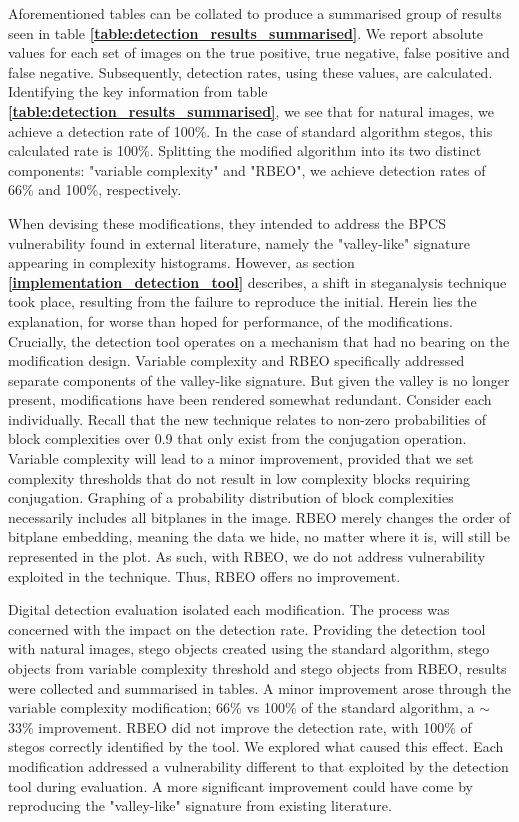 \documentclass{l4proj}
\begin{document}
Aforementioned tables can be collated to produce a summarised group of results seen in table \textbf{\ref{table:detection_results_summarised}}. 
We report absolute values for each set of images on the true positive, true negative, false positive and false negative. Subsequently, detection rates, using these values, are calculated. Identifying the key information from table \textbf{\ref{table:detection_results_summarised}}, we see that for natural images, we achieve a detection rate of 100\%. In the case of standard algorithm stegos, this calculated rate is 100\%. Splitting the modified algorithm into its two distinct components: "variable complexity" and "RBEO", we achieve detection rates of 66\% and 100\%, respectively. 

When devising these modifications, they intended to address the BPCS vulnerability found in external literature, namely the "valley-like" signature appearing in complexity histograms. However, as section \textbf{\ref{implementation_detection_tool}} describes, a shift in steganalysis technique took place, resulting from the failure to reproduce the initial. Herein lies the explanation, for worse than hoped for performance, of the modifications. Crucially, the detection tool operates on a mechanism that had no bearing on the modification design. Variable complexity and RBEO specifically addressed separate components of the valley-like signature. But given the valley is no longer present, modifications have been rendered somewhat redundant. Consider each individually. Recall that the new technique relates to non-zero probabilities of block complexities over 0.9 that only exist from the conjugation operation. Variable complexity will lead to a minor improvement, provided that we set complexity thresholds that do not result in low complexity blocks requiring conjugation. Graphing of a probability distribution of block complexities necessarily includes all bitplanes in the image. RBEO merely changes the order of bitplane embedding, meaning the data we hide, no matter where it is, will still be represented in the plot. As such, with RBEO, we do not address vulnerability exploited in the technique. Thus, RBEO offers no improvement.

Digital detection evaluation isolated each modification. The process was concerned with the impact on the detection rate. Providing the detection tool with natural images, stego objects created using the standard algorithm, stego objects from variable complexity threshold and stego objects from RBEO, results were collected and summarised in tables. A minor improvement arose through the variable complexity modification; 66\% vs 100\% of the standard algorithm, a $\sim$33\% improvement. RBEO did not improve the detection rate, with 100\% of stegos correctly identified by the tool.  We explored what caused this effect. Each modification addressed a vulnerability different to that exploited by the detection tool during evaluation. A more significant improvement could have come by reproducing the "valley-like" signature from existing literature.
\end{document}
